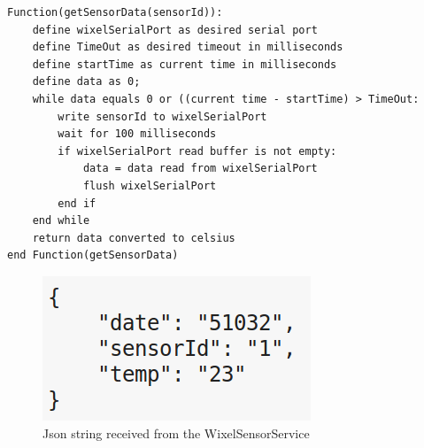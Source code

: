 \begin{lstlisting}[frame=single, label=pseodoWixelSensorService, caption={Pseudocode of WixelSensorService getSensorData() function}]
Function(getSensorData(sensorId)):
    define wixelSerialPort as desired serial port
    define TimeOut as desired timeout in milliseconds
    define startTime as current time in milliseconds
    define data as 0;
    while data equals 0 or ((current time - startTime) > TimeOut:
        write sensorId to wixelSerialPort
        wait for 100 milliseconds
        if wixelSerialPort read buffer is not empty:
            data = data read from wixelSerialPort
            flush wixelSerialPort
        end if
    end while
    return data converted to celsius
end Function(getSensorData)
\end{lstlisting}
\begin{figure}
\centering
\includegraphics[width=0.4\linewidth]{graphics/JsonTemp}
\caption{Json\cite{json} string received from the WixelSensorService\label{fig:JsonTemp}}
\end{figure}

